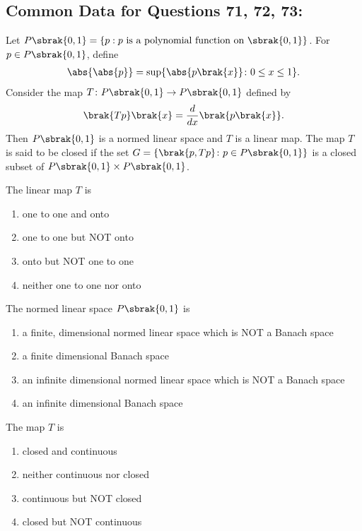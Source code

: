 \subsection*{Common Data for Questions 71, 72, 73:}
Let $P\sbrak{0,1} = \{p: p \text{ is a polynomial function on } \sbrak{0,1}\}$. For $p \in P\sbrak{0,1}$, define 
\begin{align*}
    \abs{\abs{p}} = \text{sup} \{\abs{p\brak{x}}\colon 0 \leq x \leq 1\}.
\end{align*}
Consider the map $T \colon P\sbrak{0,1} \rightarrow P\sbrak{0,1}$ defined by
\begin{align*}
    \brak{Tp}\brak{x} = \frac{d}{dx}\brak{p\brak{x}}.
\end{align*}
Then $P\sbrak{0,1}$ is a normed linear space and $T$ is a linear map. The map $T$ is said to be closed if the set $G = \{\brak{p,Tp} \colon p \in P\sbrak{0,1}\}$ is a closed subset of $P\sbrak{0,1} \times P\sbrak{0,1}$.
\item The linear map $T$ is
\begin{multicols}{2}
    \begin{enumerate}
        \item one to one and onto
        \item one to one but NOT onto
        \item onto but NOT one to one
        \item neither one to one nor onto
    \end{enumerate}
\end{multicols}
\item The normed linear space $P\sbrak{0,1}$ is 
\begin{multicols}{2}
    \begin{enumerate}
        \item a finite, dimensional normed linear space which is NOT a Banach space
        \item a finite dimensional Banach space
        \item an infinite dimensional normed linear space which is NOT a Banach space
        \item an infinite dimensional Banach space
    \end{enumerate}
\end{multicols}
\item The map $T$ is
\begin{multicols}{2}
    \begin{enumerate}
        \item closed and continuous
        \item neither continuous nor closed 
        \item continuous but NOT closed
        \item closed but NOT continuous
    \end{enumerate}
\end{multicols}

